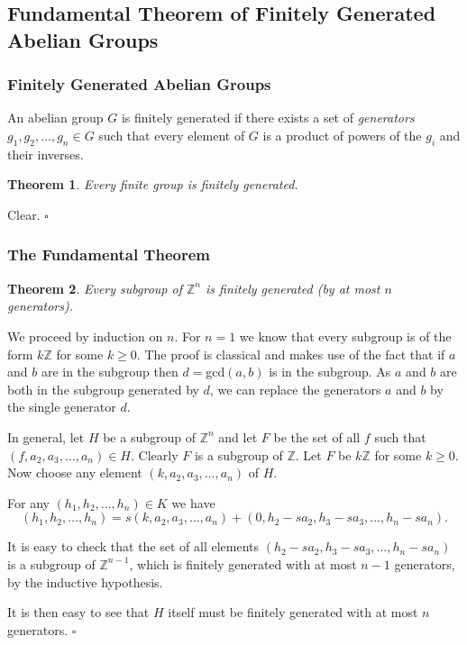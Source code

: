 \documentclass[10pt]{article}
\newtheorem{theorem}{Theorem}[section]
\newenvironment{proof}[1][Proof]{\begin{trivlist}
\item[\hskip \labelsep {\itshape #1}]}{\end{trivlist}}
\newenvironment{definition}[1][Definition]{\begin{trivlist}
\item[\hskip \labelsep {\bfseries #1}]}{\end{trivlist}}
\begin{document}
\subsection{Fundamental Theorem of Finitely Generated Abelian Groups}

\subsubsection{Finitely Generated Abelian Groups}

\begin{definition}
An abelian group $G$ is finitely generated if there exists a set of \emph{generators} $g_1, g_2, \ldots, g_n \in G$ such that every element of $G$ is a product of powers of the $g_i$ and their inverses.
\end{definition}

\begin{theorem}
Every finite group is finitely generated.
\end{theorem}

\begin{proof}
Clear. $\square$
\end{proof}

\subsubsection{The Fundamental Theorem}

\begin{theorem}
Every subgroup of $\mathbb{Z}^n$ is finitely generated (by at most $n$ generators).
\end{theorem}

\begin{proof}
We proceed by induction on $n$. For $n = 1$ we know that every subgroup is of the form $k\mathbb{Z}$ for some $k \geq 0$. The proof is classical and makes use of the fact that if $a$ and $b$ are in the subgroup then $d = $gcd$(a, b)$ is in the subgroup. As $a$ and $b$ are both in the subgroup generated by $d$, we can replace the generators $a$ and $b$ by the single generator $d$.

In general, let $H$ be a subgroup of $\mathbb{Z}^n$ and let $F$ be the set of all $f$ such that $(f, a_2, a_3, \ldots, a_n) \in H$. Clearly $F$ is a subgroup of $\mathbb{Z}$. Let $F$ be $k\mathbb{Z}$ for some $k \geq 0$. Now choose any element $(k, a_2, a_3, \ldots, a_n)$ of $H$.

For any $(h_1, h_2, \ldots, h_n) \in K$ we have
$$(h_1, h_2, \ldots, h_n) = s(k, a_2, a_3, \ldots, a_n) + (0, h_2 - sa_2, h_3 - sa_3, \ldots, h_n - sa_n).$$

It is easy to check that the set of all elements $(h_2 - sa_2, h_3 - sa_3, \ldots, h_n - sa_n)$ is a subgroup of $\mathbb{Z}^{n-1}$, which is finitely generated with at most $n - 1$ generators, by the inductive hypothesis.

It is then easy to see that $H$ itself must be finitely generated with at most $n$ generators. $\square$
\end{proof}
\end{document}
